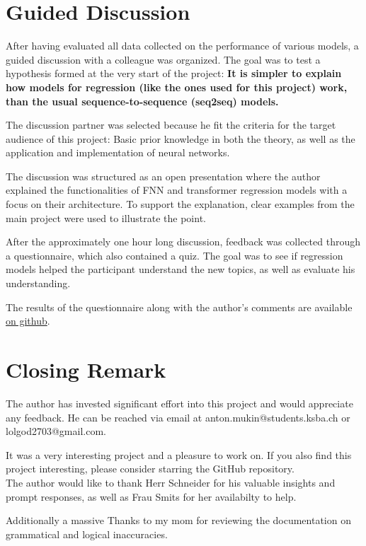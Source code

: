 \documentclass{article}
\begin{document}
\section{Guided Discussion}
After having evaluated all data collected on the performance of various models, a guided discussion with a colleague was organized. The goal was to test a hypothesis formed at the very start of the project: \textbf{It is simpler to explain how models for regression (like the ones used for this project) work, than the usual sequence-to-sequence (seq2seq) models.}

The discussion partner was selected because he fit the criteria for the target audience of this project: Basic prior knowledge in both the theory, as well as the application and implementation of neural networks.

The discussion was structured as an open presentation where the author explained the functionalities of FNN and transformer regression models with a focus on their architecture. To support the explanation, clear examples from the main project were used to illustrate the point.

After the approximately one hour long discussion, feedback was collected through a questionnaire, which also contained a quiz. The goal was to see if regression models helped the participant understand the new topics, as well as evaluate his understanding.

The results of the questionnaire along with the author's comments are available \href{https://github.com/AntonStantan/matura/tree/main/documentation/Questionnaire.pdf}{on github}.

\section{Closing Remark}

The author has invested significant effort into this project and would appreciate any feedback. He can be reached via email at anton.mukin@students.ksba.ch or lolgod2703@gmail.com.

It was a very interesting project and a pleasure to work on.
If you also find this project interesting, please consider starring the GitHub repository.
\\[1em]
The author would like to thank Herr Schneider for his valuable insights and prompt responses, as well as Frau Smits for her availabilty to help. 

Additionally a massive Thanks to my mom for reviewing the documentation on grammatical and logical inaccuracies.


\newpage
\printbibliography[heading=bibintoc]
\end{document}
